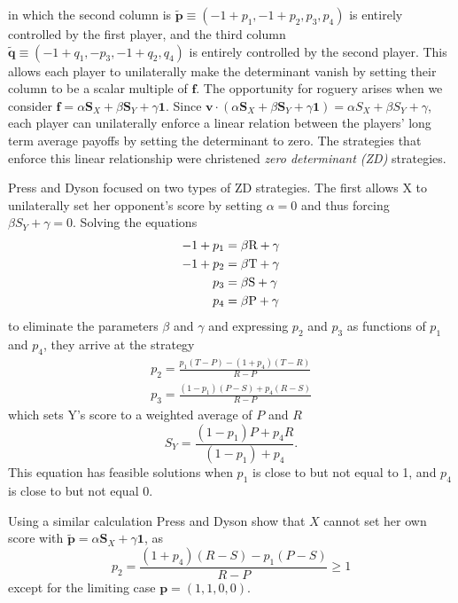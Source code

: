 in which the second column is $\tilde{\mathbf{p}} \equiv (-1 + p_1, -1 + p_2, p_3, p_4)$ is entirely controlled by the first player, and the third column $\tilde{\mathbf{q}} \equiv (-1 + q_1, -p_3, -1 + q_2, q_4)$ is entirely controlled by the second player. This allows each player to unilaterally make the determinant vanish by setting their column to be a scalar multiple of $\mathbf{f}$. The opportunity for roguery arises when we consider $\mathbf{f} = \alpha \mathbf{S}_X + \beta \mathbf{S}_Y + \gamma\mathbf{1}$. Since $\mathbf{v} \cdot  (\alpha \mathbf{S}_X + \beta \mathbf{S}_Y + \gamma\mathbf{1}) = \alpha S_X + \beta S_Y + \gamma$, each player can unilaterally enforce a linear relation between the players' long term average payoffs by setting the determinant to zero. The strategies that enforce this linear relationship were christened \textit{zero determinant (ZD)} strategies.

Press and Dyson focused on two types of ZD strategies. The first allows X  to unilaterally set her opponent's score by setting $\alpha = 0$ and thus forcing $\beta S_Y + \gamma = 0$. Solving the equations
\begin{align*}
-1 + p_1 &= \beta \textrm{R} + \gamma \\
-1 + p_2 &= \beta \textrm{T} + \gamma \\
p_3 &= \beta \textrm{S} + \gamma \\
p_4 &= \beta \textrm{P} + \gamma
\end{align*}
to eliminate the parameters $\beta$ and $\gamma$ and expressing $p_2$ and $p_3$ as functions of $p_1$ and $p_4$, they arrive at the strategy
\begin{align*}
p_2 = \frac{p_1(T - P) - (1+p_4)(T-R)}{R-P} \\
p_3 = \frac{(1-p_1)(P-S)+p_4(R-S)}{R-P}
\end{align*}
which sets Y's score to a weighted average of $P$ and $R$
\[
S_Y = \frac{(1-p_1)P + p_4 R}{(1-p_1) + p_4}.
\]
This equation has feasible solutions when $p_1$ is close to but not equal to 1, and $p_4$ is close to but not equal 0.

Using a similar calculation Press and Dyson show that $X$ cannot set her own score with $\tilde{\mathbf{p}} = \alpha \mathbf{S}_X + \gamma \mathbf{1}$, as
\[
p_2 = \frac{(1+p_4)(R-S) - p_1(P-S)}{R-P} \geq 1
\]
except for the limiting case $\mathbf{p} = (1, 1, 0, 0)$.


